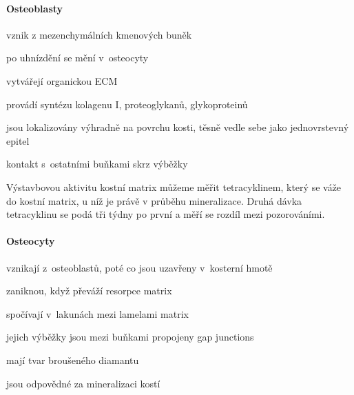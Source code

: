 \documentclass[DIV=8]{scrreprt}
\begin{document}
\paragraph{Osteoblasty}
\begin{myItemize}[nosep]
    \item vznik z mezenchymálních kmenových buněk
    \item po uhnízdění se mění v osteocyty
    \item vytvářejí organickou ECM
\begin{myItemize}[nosep]
    \item provádí syntézu kolagenu I, proteoglykanů, glykoproteinů
\end{myItemize}

    \item jsou lokalizovány výhradně na povrchu kosti, těsně vedle sebe jako jednovrstevný epitel
    \item kontakt s ostatními buňkami skrz výběžky
\end{myItemize}



Výstavbovou aktivitu kostní matrix můžeme měřit tetracyklinem, který se váže do kostní matrix, u níž je právě v průběhu mineralizace. Druhá dávka tetracyklinu se podá tři týdny po první a měří se rozdíl mezi pozorováními.

\paragraph{Osteocyty}
\begin{myItemize}[nosep]
    \item vznikají z osteoblastů, poté co jsou uzavřeny v kosterní hmotě
    \item zaniknou, když převáží resorpce matrix
    \item spočívají v lakunách mezi lamelami matrix
    \item jejich výběžky jsou mezi buňkami propojeny gap junctions
    \item mají tvar broušeného diamantu
    \item jsou odpovědné za mineralizaci kostí
\end{myItemize}
\end{document}
